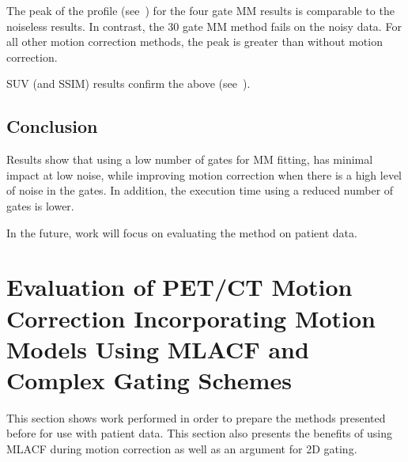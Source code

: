             The peak of the profile (see~) for the four gate \gls{MM} results is comparable to the noiseless results. In contrast, the $30$ gate \gls{MM} method fails on the noisy data. For all other motion correction methods, the peak is greater than without motion correction.
             
            \gls{SUV} (and \gls{SSIM}) results confirm the above (see~).

        \subsection{Conclusion} \label{sec:pet_ct_motion_correction_exploiting_motion_models_fit_on_coarsely_gated_data_applied_to_finely_gated_data_conclusion}
            Results show that using a low number of gates for \gls{MM} fitting, has minimal impact at low noise, while improving motion correction when there is a high level of noise in the gates. In addition, the execution time using a reduced number of gates is lower.
            
            In the future, work will focus on evaluating the method on patient data.

    \section{Evaluation of PET/CT Motion Correction Incorporating Motion Models Using MLACF and Complex Gating Schemes} \label{sec:evaluation_of_pet_ct_motion_correction_incorporating_motion_models_using_mlacf_and_complex_gating_schemes}
        This section shows work performed in order to prepare the methods presented before for use with patient data. This section also presents the benefits of using \gls{MLACF} during motion correction as well as an argument for \gls{2D} gating.

